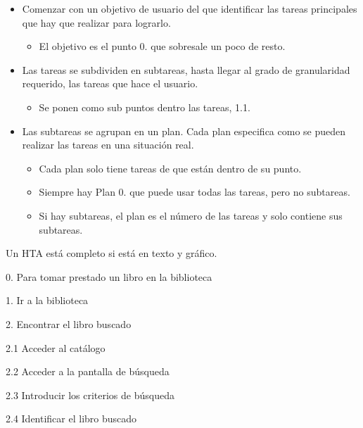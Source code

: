 \documentclass[12pt, twoside, openright]{report} %
\begin{document}
\begin{itemize}
	\item Comenzar con un objetivo de usuario del que identificar las
	      tareas principales que hay que realizar para lograrlo.

	      \begin{itemize}
		      \item El objetivo es el punto 0. que sobresale un poco de resto.
	      \end{itemize}
	\item Las tareas se subdividen en subtareas, hasta llegar al grado
	      de granularidad requerido, las tareas que hace el usuario.

	      \begin{itemize}
		      \item Se ponen como sub puntos dentro las tareas, 1.1.
	      \end{itemize}
	\item Las subtareas se agrupan en un plan. Cada plan especifica como
	      se pueden realizar las tareas en una situación real.

	      \begin{itemize}
		      \item Cada plan solo tiene tareas de que están dentro de su punto.
		      \item Siempre hay Plan 0. que puede usar todas las tareas, pero no
		            subtareas.
		      \item Si hay subtareas, el plan es el número de las tareas y solo
		            contiene sus subtareas.
	      \end{itemize}
\end{itemize}

Un HTA está completo si está en texto y gráfico.

0. Para tomar prestado un libro en la biblioteca

1. Ir a la biblioteca

2. Encontrar el libro buscado

\hspace{.6cm} 2.1 Acceder al catálogo

\hspace{.6cm} 2.2 Acceder a la pantalla de búsqueda

\hspace{.6cm} 2.3 Introducir los criterios de búsqueda

\hspace{.6cm} 2.4 Identificar el libro buscado
\end{document}
